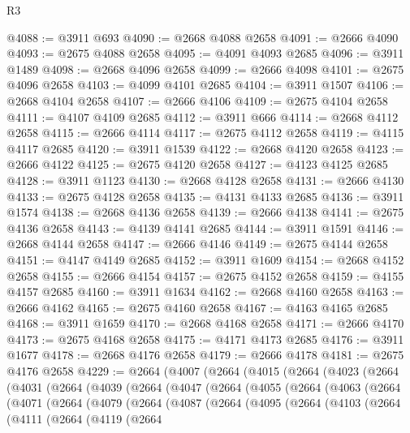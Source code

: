 \begin{lexlean}{R3}
\begin{coremodule}
@4088 := @3911 @693
@4090 := @2668 @4088 @2658
@4091 := @2666 @4090
@4093 := @2675 @4088 @2658
@4095 := @4091 @4093 @2685
@4096 := @3911 @1489
@4098 := @2668 @4096 @2658
@4099 := @2666 @4098
@4101 := @2675 @4096 @2658
@4103 := @4099 @4101 @2685
@4104 := @3911 @1507
@4106 := @2668 @4104 @2658
@4107 := @2666 @4106
@4109 := @2675 @4104 @2658
@4111 := @4107 @4109 @2685
@4112 := @3911 @666
@4114 := @2668 @4112 @2658
@4115 := @2666 @4114
@4117 := @2675 @4112 @2658
@4119 := @4115 @4117 @2685
@4120 := @3911 @1539
@4122 := @2668 @4120 @2658
@4123 := @2666 @4122
@4125 := @2675 @4120 @2658
@4127 := @4123 @4125 @2685
@4128 := @3911 @1123
@4130 := @2668 @4128 @2658
@4131 := @2666 @4130
@4133 := @2675 @4128 @2658
@4135 := @4131 @4133 @2685
@4136 := @3911 @1574
@4138 := @2668 @4136 @2658
@4139 := @2666 @4138
@4141 := @2675 @4136 @2658
@4143 := @4139 @4141 @2685
@4144 := @3911 @1591
@4146 := @2668 @4144 @2658
@4147 := @2666 @4146
@4149 := @2675 @4144 @2658
@4151 := @4147 @4149 @2685
@4152 := @3911 @1609
@4154 := @2668 @4152 @2658
@4155 := @2666 @4154
@4157 := @2675 @4152 @2658
@4159 := @4155 @4157 @2685
@4160 := @3911 @1634
@4162 := @2668 @4160 @2658
@4163 := @2666 @4162
@4165 := @2675 @4160 @2658
@4167 := @4163 @4165 @2685
@4168 := @3911 @1659
@4170 := @2668 @4168 @2658
@4171 := @2666 @4170
@4173 := @2675 @4168 @2658
@4175 := @4171 @4173 @2685
@4176 := @3911 @1677
@4178 := @2668 @4176 @2658
@4179 := @2666 @4178
@4181 := @2675 @4176 @2658
@4229 := @2664
    (@4007
      (@2664
        (@4015
          (@2664
            (@4023
              (@2664
                (@4031
                  (@2664
                    (@4039
                      (@2664
                        (@4047
                          (@2664
                            (@4055
                              (@2664
                                (@4063
                                  (@2664
                                    (@4071
                                      (@2664
                                        (@4079
                                          (@2664
                                            (@4087
                                              (@2664
                                                (@4095
                                                  (@2664
                                                    (@4103
                                                      (@2664
                                                        (@4111
                                                          (@2664
                                                            (@4119
                                                              (@2664

\end{coremodule}
\end{lexlean}
